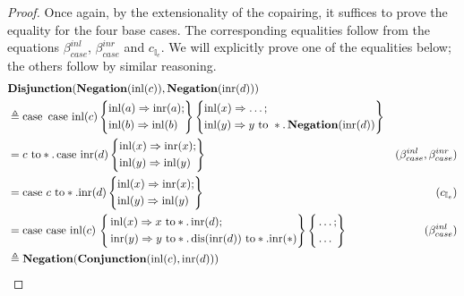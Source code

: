 \begin{proof}
  Once again, by the extensionality of the copairing, it suffices to prove the equality for the four base cases. The corresponding equalities follow from the equations 
\(\beta_{case}^{inl}\), \(\beta_{case}^{inr}\) and \(c_{\mathbb{I}_e}\). 
We will explicitly prove one of the equalities below; the others follow by similar reasoning.
\begin{equation*}
  \begin{split}
  & \textbf{Disjunction} (\textbf{Negation} (\mathrm{inl}(c)), \textbf{Negation} (\mathrm{inr}(d))) \\ 
  & \triangleq \text{case }  \, 
    \text{case } \mathrm{inl}(c)  
    \left\{ \begin{aligned}
    & \mathrm{inl}(a) \Rightarrow \mathrm{inr}(a); \\
    & \mathrm{inl}(b) \Rightarrow \mathrm{inl}(b) 
  \end{aligned}  \right\}  
   \left\{ \begin{aligned}
    & \mathrm{inl}(x) \Rightarrow  \ldots ; \\
    & \mathrm{inl}(y) \Rightarrow  y \text{ to } *. \, \textbf{Negation} (\mathrm{inr}(d))
   \end{aligned} \right\} \\
   &  =  c \text{ to} *. \, \text{case } \mathrm{inr}(d)  
    \left\{ \begin{aligned}
    & \mathrm{inl}(x) \Rightarrow \mathrm{inr}(x); \\
    & \mathrm{inl}(y) \Rightarrow \mathrm{inl}(y) 
  \end{aligned}  \right\}   & (\beta_{case}^{inl},\beta_{case}^{inr}) \\
  & =  \text{case } c \text{ to} *. \mathrm{inr}(d)  
    \left\{ \begin{aligned}
    & \mathrm{inl}(x) \Rightarrow \mathrm{inr}(x); \\
    & \mathrm{inl}(y) \Rightarrow \mathrm{inl}(y) 
  \end{aligned}  \right\}    & (c_{\mathbb{I}_e})\\
  & = \text{case }  \text{case } \mathrm{inl}(c)\,
  \left\{
    \begin{aligned}
    &\mathrm{inl}(x) \Rightarrow x \text{ to} *. \, \mathrm{inr}(d) ;\\
  \,& \mathrm{inr}(y) \Rightarrow y \text{ to} *. \,  \text{dis}(\mathrm{inr}(d)) \text{ to} *. \mathrm{inr}(*)
  \end{aligned} 
  \right\} \left\{ \begin{aligned}
    &  \ldots; \\
    & \ldots
  \end{aligned}  \right\} & (\beta_{case}^{inl})\\
  & \triangleq \textbf{Negation}(\textbf{Conjunction} (\mathrm{inl}(c), \mathrm{inr}(d))) \\
  \end{split}
\end{equation*}

\end{proof}

